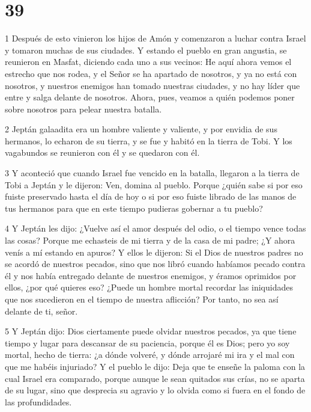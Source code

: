 \chapter{39}

\par 1 Después de esto vinieron los hijos de Amón y comenzaron a luchar contra Israel y tomaron muchas de sus ciudades. Y estando el pueblo en gran angustia, se reunieron en Masfat, diciendo cada uno a sus vecinos: He aquí ahora vemos el estrecho que nos rodea, y el Señor se ha apartado de nosotros, y ya no está con nosotros, y nuestros enemigos han tomado nuestras ciudades, y no hay líder que entre y salga delante de nosotros. Ahora, pues, veamos a quién podemos poner sobre nosotros para pelear nuestra batalla.

\par 2 Jeptán galaadita era un hombre valiente y valiente, y por envidia de sus hermanos, lo echaron de su tierra, y se fue y habitó en la tierra de Tobi. Y los vagabundos se reunieron con él y se quedaron con él.

\par 3 Y aconteció que cuando Israel fue vencido en la batalla, llegaron a la tierra de Tobi a Jeptán y le dijeron: Ven, domina al pueblo. Porque ¿quién sabe si por eso fuiste preservado hasta el día de hoy o si por eso fuiste librado de las manos de tus hermanos para que en este tiempo pudieras gobernar a tu pueblo?

\par 4 Y Jeptán les dijo: ¿Vuelve así el amor después del odio, o el tiempo vence todas las cosas? Porque me echasteis de mi tierra y de la casa de mi padre; ¿Y ahora venís a mí estando en apuros? Y ellos le dijeron: Si el Dios de nuestros padres no se acordó de nuestros pecados, sino que nos libró cuando habíamos pecado contra él y nos había entregado delante de nuestros enemigos, y éramos oprimidos por ellos, ¿por qué quieres eso? ¿Puede un hombre mortal recordar las iniquidades que nos sucedieron en el tiempo de nuestra aflicción? Por tanto, no sea así delante de ti, señor.

\par 5 Y Jeptán dijo: Dios ciertamente puede olvidar nuestros pecados, ya que tiene tiempo y lugar para descansar de su paciencia, porque él es Dios; pero yo soy mortal, hecho de tierra: ¿a dónde volveré, y dónde arrojaré mi ira y el mal con que me habéis injuriado? Y el pueblo le dijo: Deja que te enseñe la paloma con la cual Israel era comparado, porque aunque le sean quitados sus crías, no se aparta de su lugar, sino que desprecia su agravio y lo olvida como si fuera en el fondo de las profundidades.


